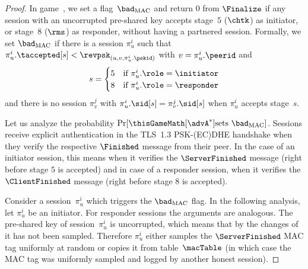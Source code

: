\begin{proof}
	In game~\thisGameMath[\advA^*], we set a flag~$\bad_{\mathrm{MAC}}$ and return $0$ from $\Finalize$ if any session with an uncorrupted pre-shared key accepts stage~$5$ ($\chtk$) as initiator, or stage~$8$ ($\rms$) as responder, without having a partnered session.
	Formally, we set $\bad_{\mathrm{MAC}}$ if there is a session $\pi_u^i$ such that $\pi_u^i.\taccepted[s] < \revpsk_{(u,v,\pi_u^i.\pskid)}$ with $v = \pi_u^i.\peerid$ and 
	\[
		s = \begin{cases}
				5 & \mbox{if } \pi_u^i.\role = \initiator \\
				8 & \mbox{if } \pi_u^i.\role = \responder
		\end{cases}
	\]
	and there is no session $\pi_v^j$ with $\pi_u^i.\sid[s] = \pi_v^j.\sid[s]$ when $\pi_u^i$ accepts stage~$s$.
	
	Let us analyze the probability $\Pr[ \thisGameMath[\advA^*] \text{sets } \bad_\mathrm{MAC}]$.
	Sessions receive explicit authentication in the TLS~1.3 PSK-(EC)DHE handshake when they verify the respective $\Finished$ message from their peer.
	In the case of an initiator session, this means when it verifies the $\ServerFinished$ message (right before stage $5$ is accepted) and in case of a responder session, when it verifies the $\ClientFinished$ message (right before stage $8$ is accepted).
	
	Consider a session~$\pi_u^i$ which triggers the $\bad_{\mathrm{MAC}}$ flag. 
	In the following analysis, let $\pi_u^i$ be an initiator.
	For responder sessions the arguments are analogous.
	The pre-shared key of session~$\pi_u^i$ is uncorrupted, which means that by the changes of  it has not been sampled. 
	Therefore $\pi_u^i$ either samples the $\ServerFinished$ MAC tag uniformly at random or copies it from table~$\macTable$ (in which case the MAC tag was uniformly sampled and logged by another honest session).
	

\end{proof}

